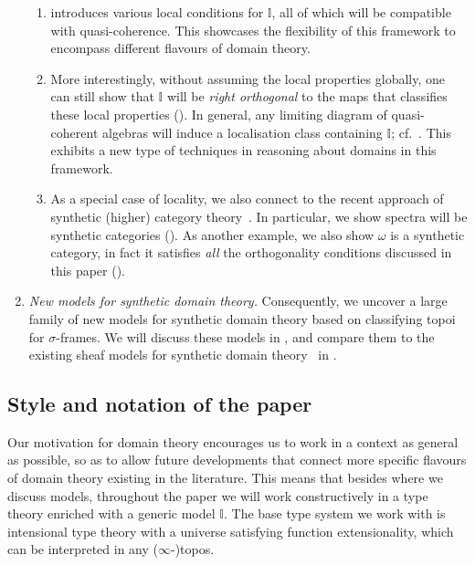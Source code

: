 \documentclass[12pt]{amsart}
\theoremstyle{definition}
\newcommand{\mbb}[1]{\mathbb{#1}}
\newcommand{\I}{\mbb I}
\begin{document}
\begin{enumerate}
\begin{enumerate}
    \item {} introduces various local conditions for $\I$, all of which will be compatible with quasi-coherence. This showcases the flexibility of this framework to encompass different flavours of domain theory.

    \item  More interestingly, without assuming the local properties globally, one can still show that $\I$ will be \emph{right orthogonal} to the maps that classifies these local properties (). In general, any limiting diagram of quasi-coherent algebras will induce a localisation class containing $\I$; cf.\ . This exhibits a new type of techniques in reasoning about domains in this framework.
    
    \item As a special case of locality, we also connect to the recent approach of synthetic (higher) category theory~\cite{riehl2017type,buchholtz2021synthetic,gratzer2024directed}. In particular, we show spectra will be synthetic categories (). As another example, we also show $\omega$ is a synthetic category, in fact it satisfies \emph{all} the orthogonality conditions discussed in this paper (). 
  \end{enumerate}

  \item \emph{New models for synthetic domain theory.} Consequently, we uncover a large family of new models for synthetic domain theory based on classifying topoi for $\sigma$-frames. We will discuss these models in , and compare them to the existing sheaf models for synthetic domain theory~\cite{FIORE1997151} in .
\end{enumerate}






\subsection{Style and notation of the paper}

Our motivation for domain theory encourages us to work in a context as general as possible, so as to allow future developments that connect more specific flavours of domain theory existing in the literature. This means that besides  where we discuss models, throughout the paper we will work constructively in a type theory enriched with a generic model $\I$. The base type system we work with is intensional type theory with a universe satisfying function extensionality, which can be interpreted in any ($\infty$-)topos. 
\end{document}
